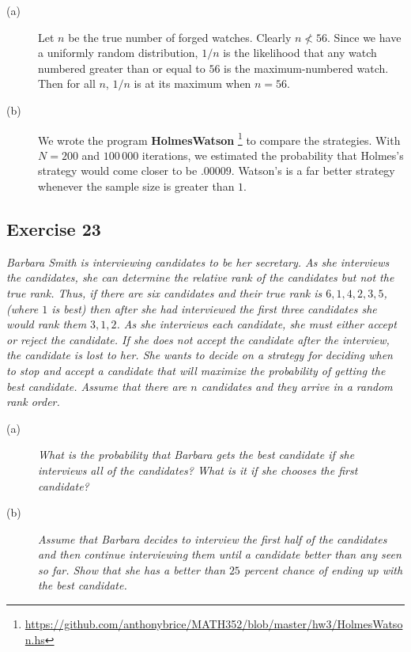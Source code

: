 \documentclass{tufte-handout}
\begin{document}
\begin{description}
\item[\rm (a)] Let $n$ be the true number of forged watches. Clearly
  $n \nless 56$. Since we have a uniformly random distribution, $1/n$
  is the likelihood that any watch numbered greater than or equal to
  $56$ is the maximum-numbered watch. Then for all $n$,
  $1/n$ is at its maximum when $n = 56$.
\item[\rm (b)] We wrote the program
  \textbf{HolmesWatson}%
  \footnote{\url{https://github.com/anthonybrice/MATH352/blob/master/hw3/HolmesWatson.hs}}
  to compare the strategies. With $N = 200$ and $100\,000$ iterations,
  we estimated the probability that Holmes's strategy would come
  closer to be $.00009$. Watson's is a far better strategy whenever
  the sample size is greater than $1$.
\end{description}

\subsection{Exercise 23}
\begin{description}
\item \emph{Barbara Smith is interviewing candidates to be her
    secretary. As she interviews the candidates, she can determine the
    relative rank of the candidates but not the true rank. Thus, if
    there are six candidates and their true rank is $6, 1, 4, 2, 3,
    5$, (where $1$ is best) then after she had interviewed the first
    three candidates she would rank them $3, 1, 2$. As she interviews
    each candidate, she must either accept or reject the candidate. If
    she does not accept the candidate after the interview, the
    candidate is lost to her. She wants to decide on a strategy for
    deciding when to stop and accept a candidate that will maximize
    the probability of getting the best candidate. Assume that there
    are $n$ candidates and they arrive in a random rank order.}
  \begin{description}
  \item[(a)] \emph{What is the probability that Barbara gets the best
      candidate if she interviews all of the candidates? What is it if
      she chooses the first candidate?}
  \item[(b)] \emph{Assume that Barbara decides to interview the first
      half of the candidates and then continue interviewing them until
      a candidate better than any seen so far. Show that she has a
      better than $25$ percent chance of ending up with the best
      candidate.}
  \end{description}
\end{description}
\end{document}
